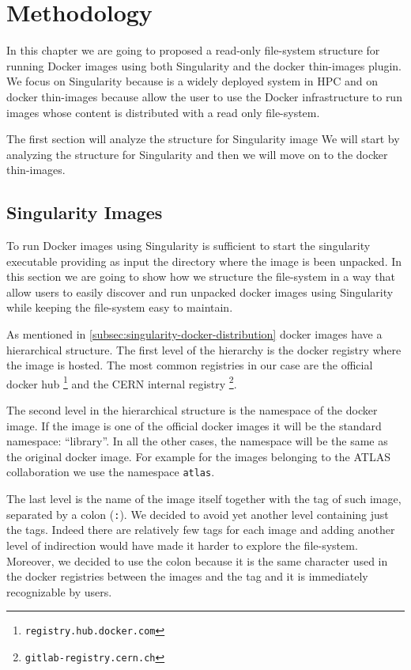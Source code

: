 \chapter{Methodology}\label{ch:Methodology}

In this chapter we are going to proposed a read-only file-system structure for
running Docker images using both Singularity and the docker thin-images plugin.
We focus on Singularity because is a widely deployed system in HPC and on
docker thin-images because allow the user to use the Docker infrastructure to
run images whose content is distributed with a read only file-system.

The first section will analyze the structure for Singularity image We will
start by analyzing the structure for Singularity and then we will move on to
the docker thin-images.

\section{Singularity Images}

To run Docker images using Singularity is sufficient to start the singularity
executable providing as input the directory where the image is been unpacked.
In this section we are going to show how we structure the file-system in a way
that allow users to easily discover and run unpacked docker images using
Singularity while keeping the file-system easy to maintain.

As mentioned in \ref{subsec:singularity-docker-distribution} docker images have
a hierarchical structure.  The first level of the hierarchy is the docker
registry where the image is hosted.  The most common registries in our case are
the official docker hub \footnote{\texttt{registry.hub.docker.com}} and the
CERN internal registry \footnote{\texttt{gitlab-registry.cern.ch}}.

The second level in the hierarchical structure is the namespace of the docker
image.  If the image is one of the official docker images it will be the
standard namespace: “library”.  In all the other cases, the namespace will be
the same as the original docker image.  For example for the images belonging to
the ATLAS collaboration we use the namespace \texttt{atlas}.

The last level is the name of the image itself together with the tag of such
image, separated by a colon (\texttt{:}).  We decided to avoid yet another
level containing just the tags.  Indeed there are relatively few tags for each
image and adding another level of indirection would have made it harder to
explore the file-system.  Moreover, we decided to use the colon because it is
the same character used in the docker registries between the images and the tag
and it is immediately recognizable by users.


